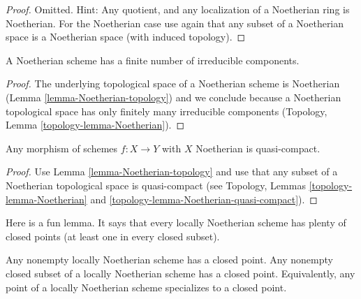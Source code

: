 \begin{proof}
Omitted. Hint: Any quotient, and any localization of a Noetherian
ring is Noetherian. For the Noetherian case use again
that any subset of a Noetherian space is a Noetherian space
(with induced topology).
\end{proof}

\begin{lemma}
\label{lemma-Noetherian-irreducible-components}
A Noetherian scheme has a finite number of irreducible components.
\end{lemma}

\begin{proof}
The underlying topological space of a Noetherian scheme is Noetherian
(Lemma \ref{lemma-Noetherian-topology})
and we conclude because a Noetherian topological space
has only finitely many irreducible components
(Topology, Lemma \ref{topology-lemma-Noetherian}).
\end{proof}

\begin{lemma}
\label{lemma-morphism-Noetherian-schemes-quasi-compact}
Any morphism of schemes $f : X \to Y$ with $X$ Noetherian
is quasi-compact.
\end{lemma}

\begin{proof}
Use Lemma \ref{lemma-Noetherian-topology}
and use that any subset of a Noetherian topological
space is quasi-compact (see Topology,
Lemmas \ref{topology-lemma-Noetherian} and
\ref{topology-lemma-Noetherian-quasi-compact}).
\end{proof}

\noindent
Here is a fun lemma.
It says that every locally Noetherian scheme has plenty of
closed points (at least one in every closed subset).

\begin{lemma}
\label{lemma-locally-Noetherian-closed-point}
Any nonempty locally Noetherian scheme has a closed point.
Any nonempty closed subset of a locally Noetherian scheme has a closed point.
Equivalently, any point of a locally Noetherian scheme specializes
to a closed point.
\end{lemma}

